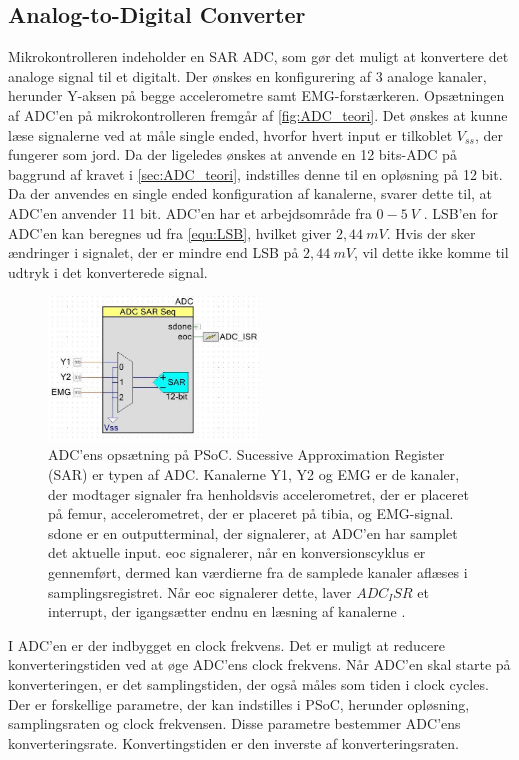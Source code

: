\subsection{Analog-to-Digital Converter}
Mikrokontrolleren indeholder en SAR ADC, som gør det muligt at konvertere det analoge signal til et digitalt. Der ønskes en konfigurering af 3 analoge kanaler, herunder Y-aksen på begge accelerometre samt EMG-forstærkeren. Opsætningen af ADC'en på mikrokontrolleren fremgår af \autoref{fig:ADC_teori}. Det ønskes at kunne læse signalerne ved at måle single ended, hvorfor hvert input er tilkoblet $V_{ss}$, der fungerer som jord. Da der ligeledes ønskes at anvende en 12 bits-ADC på baggrund af kravet i \autoref{sec:ADC_teori}, indstilles denne til en opløsning på 12 bit. Da der anvendes en single ended konfiguration af kanalerne, svarer dette til, at ADC'en anvender 11 bit. ADC'en har et arbejdsområde fra $0-5~V$ \citep{ADC2014}. LSB'en for ADC'en kan beregnes ud fra \autoref{equ:LSB}, hvilket giver $2,44~mV$. Hvis der sker ændringer i signalet, der er mindre end LSB på $2,44~mV$, vil dette ikke komme til udtryk i det konverterede signal. 


\begin{figure}[H]
\centering
\includegraphics[width=0.5\textwidth]{figures/implementering/ADC_imp.jpg}
\caption{ADC'ens opsætning på PSoC. Sucessive Approximation Register (SAR) er typen af ADC. Kanalerne Y1, Y2 og EMG er de kanaler, der modtager signaler fra henholdsvis accelerometret, der er placeret på femur, accelerometret, der er placeret på tibia, og EMG-signal. sdone er en outputterminal, der signalerer, at ADC'en har samplet det aktuelle input. eoc signalerer, når en konversionscyklus er gennemført, dermed kan værdierne fra de samplede kanaler aflæses i samplingsregistret. Når eoc signalerer dette, laver $ADC_ISR$ et interrupt, der igangsætter endnu en læsning af kanalerne \citep{ADC2014}.}
\label{fig:ADC_teori}
\end{figure}

\noindent
I ADC'en er der indbygget en clock frekvens. Det er muligt at reducere konverteringstiden ved at øge ADC'ens clock frekvens. Når ADC'en skal starte på konverteringen, er det samplingstiden, der også måles som tiden i clock cycles. Der er forskellige parametre, der kan indstilles i PSoC, herunder opløsning, samplingsraten og clock frekvensen. Disse parametre bestemmer ADC'ens konverteringsrate. Konvertingstiden er den inverste af konverteringsraten. 

